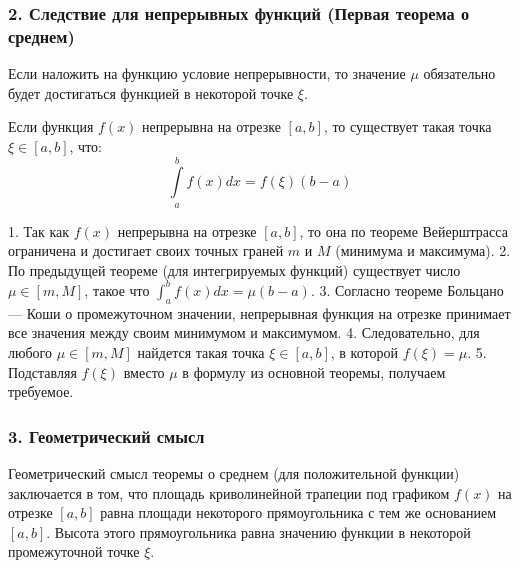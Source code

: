 \subsubsection*{2. Следствие для непрерывных функций (Первая теорема о среднем)}

Если наложить на функцию условие непрерывности, то значение $\mu$ обязательно будет достигаться функцией в некоторой точке $\xi$.

\begin{consequence}
Если функция $f(x)$ непрерывна на отрезке $[a, b]$, то существует такая точка $\xi \in [a, b]$, что:
\[ \int\limits_a^b f(x) dx = f(\xi)(b - a) \]
\end{consequence}

\begin{tcolorbox}[title=Доказательство, breakable]
1. Так как $f(x)$ непрерывна на отрезке $[a, b]$, то она по теореме Вейерштрасса ограничена и достигает своих точных граней $m$ и $M$ (минимума и максимума).
2. По предыдущей теореме (для интегрируемых функций) существует число $\mu \in [m, M]$, такое что $\int_a^b f(x) dx = \mu (b - a)$.
3. Согласно теореме Больцано — Коши о промежуточном значении, непрерывная функция на отрезке принимает все значения между своим минимумом и максимумом. 
4. Следовательно, для любого $\mu \in [m, M]$ найдется такая точка $\xi \in [a, b]$, в которой $f(\xi) = \mu$. 
5. Подставляя $f(\xi)$ вместо $\mu$ в формулу из основной теоремы, получаем требуемое.
\end{tcolorbox}

\subsubsection*{3. Геометрический смысл}

Геометрический смысл теоремы о среднем (для положительной функции) заключается в том, что площадь криволинейной трапеции под графиком $f(x)$ на отрезке $[a, b]$ равна площади некоторого прямоугольника с тем же основанием $[a, b]$. Высота этого прямоугольника равна значению функции в некоторой промежуточной точке $\xi$.


